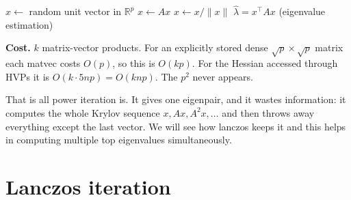 \documentclass[11pt]{article}
\begin{document}
\begin{algorithmic}[1]
\State $x \gets$ random unit vector in $\mathbb{R}^p$
  \State $x \gets A x$ 
  \State $x \gets x / \|x\|$
\EndFor
\State \Return $\hat\lambda = x^\top A x$ (eigenvalue estimation)
\end{algorithmic}

\textbf{Cost.} $k$ matrix-vector products. For an explicitly stored dense $\sqrt{p} \times \sqrt{p}$ matrix each matvec costs $O(p)$, so this is $O(kp)$. For the Hessian accessed through HVPs it is $O(k \cdot 5np) = O(knp)$. The $p^2$ never appears.


That is all power iteration is. It gives one eigenpair, and it wastes information: it computes the whole Krylov sequence $x, Ax, A^2x, \dots$ and then throws away everything except the last vector. We will see how lanczos keeps it and this helps in computing multiple top eigenvalues simultaneously.

\section{Lanczos iteration}
\end{document}
